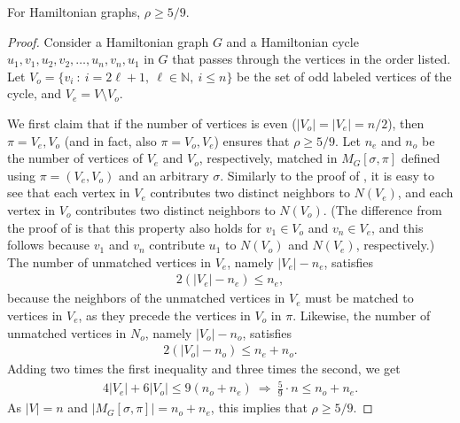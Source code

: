 \begin{theorem}
%
%
%
%
  For Hamiltonian graphs, $\rho \ge 5/9$.
%
	\label{thm:hamiltonian-5-9}
\end{theorem}

\begin{proof}
Consider a Hamiltonian graph $G$ and a Hamiltonian cycle $u_1,v_1,u_2,v_2,\ldots, u_n,v_n,u_1$ 
%
%
in $G$ that passes through the vertices in the order listed. %
Let $V_o=\{v_i\ :\ i=2\ell+1,\ \ell\in \mathbb{N},\ i\leq n \}$ be the set of odd labeled vertices of the cycle, and $V_e=V\setminus V_o$.
	
	We first claim that if the number of vertices is even 
%
($|V_o|=|V_e|=n/2$),   %
then $\pi=V_e, V_o$ (and in fact, also $\pi=V_o, V_e$) ensures that $\rho\ge 5/9$.
%
Let $n_e$ and $n_o$ be the number of vertices of $V_e$ and $V_o$, respectively,
%
matched in $M_G[\sigma,\pi]$ defined using $\pi=(V_e,V_o)$ and an arbitrary $\sigma$. %
Similarly   %
to the proof of , it is easy to see that each vertex in $V_e$ contributes two distinct neighbors to $N(V_e)$, and each vertex in $V_o$ contributes two distinct neighbors to $N(V_o)$. %
%
(The difference from the proof of  is that this property also holds for $v_1\in V_o$ and $v_n\in V_e$, and this follows because $v_1$ and $v_n$ contribute $u_1$ to $N(V_o)$ and $N(V_e)$, respectively.)  %
 The number of unmatched vertices in $V_e$, namely $|V_e|-n_e$, satisfies \begin{eqnarray}2(|V_e|-n_e)\leq n_e,   %
	\end{eqnarray} because the neighbors of the unmatched vertices in $V_e$ must be matched to vertices in $V_e$, as they precede the vertices in $V_o$ in  $\pi$. Likewise, the number of unmatched vertices in $N_o$, namely $|V_o|-n_o$, satisfies \begin{eqnarray}2(|V_o|-n_o)\leq n_e+n_o.
\end{eqnarray} Adding two times the first inequality and three times the second, we get \begin{eqnarray}4|V_e| + 6|V_o|\leq 9(n_o+n_e)\ \Rightarrow \ \frac{5}{9}\cdot n\leq n_o+n_e.
\end{eqnarray} As $|V|=n$ and  $|M_G[\sigma,\pi]|=n_o+n_e$, this implies that 
%
$\rho\geq 5/9.$   %
	

\end{proof}
